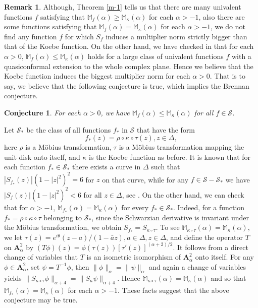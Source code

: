 \documentclass[10pt]{amsart}
\newtheorem{conjecture}[theorem]{Conjecture}
\theoremstyle{definition}    %
\newtheorem{remark}[theorem]{Remark}
\numberwithin{equation}{section}
\begin{document}
\begin{remark}
Although, Theorem \ref{m-1} tells us that there are many univalent functions $f$ satisfying that $\mathbb{M}_f(\alpha)\geq \mathbb{M}_{\kappa}(\alpha)$ for each $\alpha>-1$, also there are some functions satisfying that $\mathbb{M}_f(\alpha)=\mathbb{M}_{\kappa}(\alpha)$ for each $\alpha>-1$, we do not find any function $f$ for which $S_f$ induces a multiplier norm strictly bigger than that of the Koebe function. On the other hand, we have checked in \cite{Jin-1} that for each $\alpha>0$, $\mathbb{M}_f(\alpha)\leq \mathbb{M}_{\kappa}(\alpha)$ holds for a large class of univalent functions $f$ with a quasiconformal extension to the whole complex plane.  Hence we believe that the Koebe function 
induces the biggest multiplier norm for each $\alpha>0$. That is to say, we believe that the following conjecture is true, which implies the Brennan conjecture. \end{remark}
\begin{conjecture}\label{k}
For each $\alpha>0$, we have $\mathbb{M}_f(\alpha)\leq \mathbb{M}_{\kappa}(\alpha)$ for all $f\in \mathcal{S}$. 
\end{conjecture}
Let $\mathcal{S}_{*}$ be the class of all functions $f_{*}$ in $\mathcal{S}$ that have the form 
$$f_{*}(z)=\rho\circ \kappa \circ  \tau(z), z\in \Delta,$$
here $\rho$ is a M\"obius transformation, $\tau$ is a M\"obius transformation mapping the unit disk onto itself, and $\kappa$ is the Koebe function as before.  It is known that for each function $f_{*}\in \mathcal{S}_{*}$ there exists a curve in $\Delta$ such that $|S_{f_{*}}(z)|(1-|z|^2)^2=6$ for $z$ on that curve, while for any $f\in \mathcal{S}-\mathcal{S}_{*}$ we have $|S_f(z)|(1-|z|^2)^2<6$ for all $z\in \Delta$, see \cite[Page 60]{L}. On the other hand, we can check that for $\alpha>-1$, $\mathbb{M}_{f_{*}}(\alpha)=\mathbb{M}_{\kappa}(\alpha)$ for every $f_{*}\in \mathcal{S}_{*}$.
Indeed, for a function $f_* = \rho \circ \kappa \circ \tau$ belonging to $\mathcal{S}_{*}$, since the Schwarzian derivative is invariant under the Möbius transformation, we obtain $S_{f_{*}}=S_{\kappa\circ \tau}$.
To see $\mathbb{M}_{\kappa\circ\tau}(\alpha)=\mathbb{M}_{\kappa}(\alpha)$, we let $\tau(z)=e^{i\theta}(z-a)/{(1-\bar{a}z)}, a\in \Delta, z\in \Delta$, and define the operator $T$ on $\mathbf{A}_\alpha^2$ by
$(T\phi)(z) = \phi(\tau(z))[\tau'(z)]^{(\alpha+2)/2}$. It follows from a direct change of variables that $T$ is an isometric isomorphism of $\mathbf{A}_\alpha^2$ onto itself.
For any $\phi\in\mathbf{A}_\alpha^2$, set $\psi = T^{-1}\phi$, then $\|\phi\|_\alpha = \|\psi\|_\alpha$ and again a change of variables yields
$
\|S_{\kappa\circ\tau}\phi\|_{\alpha+4} = \|S_{\kappa} \psi\|_{\alpha+4}.
$
Hence $\mathbb{M}_{\kappa\circ\tau}(\alpha)=\mathbb{M}_{\kappa}(\alpha)$ and so that $\mathbb{M}_{f_*}(\alpha)=\mathbb{M}_{\kappa}(\alpha)$ for each $\alpha>-1$. These facts suggest that the above conjecture may be true. 
\end{document}
